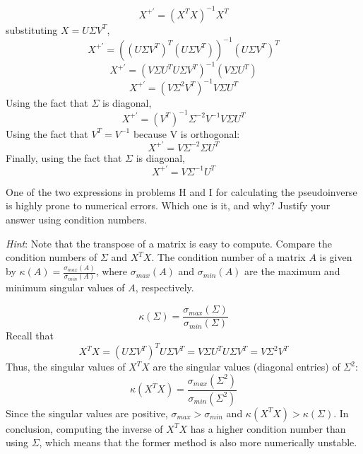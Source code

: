 \begin{solution}
	\begin{equation}
		X^{+'} = (X^T X)^{-1}X^T
	\end{equation}
	substituting $X = U \Sigma V^T$, 
	\begin{equation}
		X^{+'} = ((U \Sigma V^T)^T (U \Sigma V^T))^{-1}(U \Sigma V^T)^T
	\end{equation}
	\begin{equation}
		X^{+'} = (V \Sigma U^T U \Sigma V^T)^{-1}(V \Sigma U^T)
	\end{equation}
	\begin{equation}
		X^{+'} = (V \Sigma^2 V^T)^{-1}V \Sigma U^T
	\end{equation}
	Using the fact that $\Sigma$ is diagonal,
	\begin{equation}
		X^{+'} = (V^T)^{-1} \Sigma^{-2} V^{-1}V \Sigma U^T
	\end{equation}
	Using the fact that $V^T = V^{-1}$ because V is orthogonal:
	\begin{equation}
		X^{+'} = V \Sigma^{-2} \Sigma U^T
	\end{equation}
	Finally, using the fact that $\Sigma$ is diagonal,
	\begin{equation}
		X^{+'} = V \Sigma^{-1} U^T
	\end{equation}
\end{solution}

\problem[2] One of the two expressions in problems H and I for calculating the pseudoinverse is highly prone to numerical errors. Which one is it, and why? Justify your answer using condition numbers.

\textit{Hint}: Note that the transpose of a matrix is easy to compute. Compare the condition numbers of $\Sigma$ and $X^T X$. The condition number of a matrix $A$ is given by $\kappa(A) = \frac{\sigma_{max}(A)}{\sigma_{min}(A)}$, where $\sigma_{max}(A)$ and $\sigma_{min}(A)$ are the maximum and minimum singular values of $A$, respectively.

\begin{solution}
	\begin{equation}
		\kappa (\Sigma) = \frac{\sigma_{max}(\Sigma)}{\sigma_{min}(\Sigma)}
	\end{equation}
	Recall that
	\begin{equation}
		X^TX = (U\Sigma V^T)^T U\Sigma V^T 
		= V \Sigma U^T U \Sigma V^T
		= V \Sigma^2 V^T	
	\end{equation}
	Thus, the singular values of $X^TX$ are the singular values (diagonal entries) of $\Sigma^2$:
	\begin{equation}
		\kappa (X^TX) = \frac{\sigma_{max}(\Sigma^2)}{\sigma_{min}(\Sigma^2)}
	\end{equation}
	Since the singular values are positive, $\sigma_{max} > \sigma_{min}$ and $\kappa (X^TX) > \kappa (\Sigma)$. In conclusion, computing the inverse of $X^TX$ has a higher condition number than using $\Sigma$, which means that the former method is also more numerically unstable.
\end{solution}


